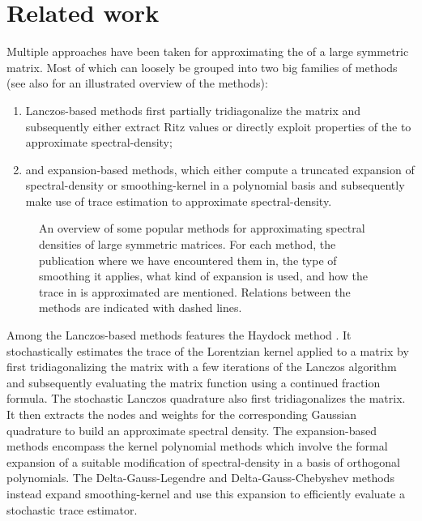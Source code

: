 
\section{Related work}
\label{sec:1-introduction-related}

Multiple approaches have been taken for approximating the 
of a large symmetric matrix. Most of which can loosely be grouped into two big families
of methods (see also  for an
illustrated overview of the methods):

\begin{enumerate}
    \item Lanczos-based methods first partially tridiagonalize the matrix and
    subsequently either extract Ritz values or directly exploit properties of the
     to approximate \gls{spectral-density};
    \item and expansion-based methods, which either compute a truncated expansion of
    \gls{spectral-density} or \gls{smoothing-kernel} in a polynomial basis and subsequently
    make use of trace estimation to approximate \gls{spectral-density}.
\end{enumerate}

\begin{figure}[ht]
    \centering
    
    \caption{An overview of some popular methods for approximating
        spectral densities of large symmetric matrices. For each method, the publication
        where we have encountered them in, the type of smoothing it applies,
        what kind of expansion is used, and how the trace in
         is approximated
        are mentioned.
        Relations between the methods are indicated with dashed lines.}
    \label{fig:1-introduction-literature-overview}
\end{figure}

Among the Lanczos-based methods features the Haydock method \cite{haydock1972electronic, lin2016review}.
It stochastically estimates the trace of the Lorentzian kernel applied to a matrix
by first tridiagonalizing the matrix with a few iterations of the Lanczos algorithm
\cite{lanczos1950iteration} and subsequently evaluating the matrix function using
a continued fraction formula. The stochastic Lanczos quadrature \cite{lin2016review, ubaru2017lanczos,chen2021slq}
also first tridiagonalizes the matrix. It then extracts the nodes and weights
for the corresponding Gaussian quadrature to build an approximate spectral density.
The expansion-based methods encompass the kernel polynomial methods \cite{silver1994kpm, wang1994kpm, weisse2006kpm}
which involve the formal expansion of a suitable modification of \gls{spectral-density}
in a basis of orthogonal polynomials. The Delta-Gauss-Legendre \cite{lin2016review}
and Delta-Gauss-Chebyshev \cite{lin2017randomized} methods instead expand \gls{smoothing-kernel}
and use this expansion to efficiently evaluate a stochastic trace estimator.\\

